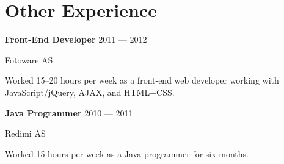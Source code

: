 \section{Other Experience}
\parbox[t][][t]{\linewidth}{
	\parbox{\linewidth}{\textbf{Front-End Developer} \hfill {{2011 --- 2012}}}
	\parbox{\linewidth}{Fotoware AS}
	\smallbreak
	\smallskip
	Worked 15--20 hours per week as a front-end web developer working with
	JavaScript/jQuery, AJAX, and HTML+CSS.
	\bigbreak
	\smallskip
}

\parbox[t][][t]{\linewidth}{
	\parbox{\linewidth}{\textbf{Java Programmer} \hfill {{2010 --- 2011}}}
	\parbox{\linewidth}{Redimi AS}
	\smallbreak
	\smallskip
	Worked 15 hours per week as a Java programmer for six months.
	\bigbreak
	\smallskip
}

%



